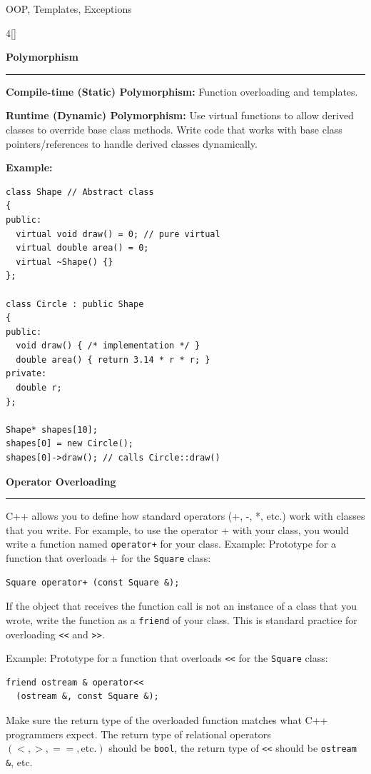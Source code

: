 \documentclass[final]{beamer}
\renewcommand{\subsection}[1]{%
  \par\vspace{1em}%
  {\noindent\usebeamerfont{subsection title}\large\bfseries #1\par}%
  \vspace{0.5em}\hrule\vspace{1em}%
}
\begin{document}
\begin{frame}[t,fragile]{OOP, Templates, Exceptions}
\begin{multicols}{4}[\setlength{\columnsep}{1.5cm}]
 \subsection{Polymorphism}
\textbf{Compile-time (Static) Polymorphism:} Function overloading and templates.

\textbf{Runtime (Dynamic) Polymorphism:} Use virtual functions to allow derived classes to override base class methods. Write code that works with base class pointers/references to handle derived classes dynamically.

\textbf{Example:}
\begin{lstlisting}
class Shape // Abstract class
{
public:
  virtual void draw() = 0; // pure virtual
  virtual double area() = 0;
  virtual ~Shape() {}
};

class Circle : public Shape
{
public:
  void draw() { /* implementation */ }
  double area() { return 3.14 * r * r; }
private:
  double r;
};

Shape* shapes[10];
shapes[0] = new Circle();
shapes[0]->draw(); // calls Circle::draw()
\end{lstlisting}

 \subsection{Operator Overloading}
C++ allows you to define how standard operators (+, -, *, etc.) work with classes that you write. For example, to use the operator $+$ with your class, you would write a function named \texttt{operator+} for your class.
Example:
Prototype for a function that overloads $+$ for the \texttt{Square} class:
\begin{lstlisting}
Square operator+ (const Square &);
\end{lstlisting}

If the object that receives the function call is not an instance of a class that you wrote, write the function as a \texttt{friend} of your class. This is standard practice for overloading \texttt{<<} and \texttt{>>}.






Example:
Prototype for a function that overloads \texttt{<<} for the \texttt{Square} class:
\begin{lstlisting}
friend ostream & operator<<
  (ostream &, const Square &);
\end{lstlisting}
Make sure the return type of the overloaded function matches what C++ programmers expect. The return type of relational operators $(<, >, ==, \text{etc.})$ should be \texttt{bool}, the return type of \texttt{<<} should be \texttt{ostream \&}, etc.



\end{multicols}
\end{frame}
\end{document}
